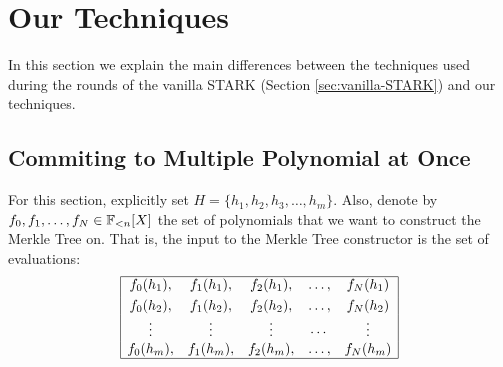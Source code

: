 

\section{Our Techniques}

In this section we explain the main differences between the techniques used during the rounds of the vanilla STARK (Section \ref{sec:vanilla-STARK}) and our techniques. 


\subsection{Commiting to Multiple Polynomial at Once}\label{sec:committing}

For this section, explicitly set $H = \{h_1,h_2,h_3,\dots,h_m\}$.
Also, denote by $f_0,f_1,\dots,f_N \in \mathbb{F}_{<n}[X]$ the set of polynomials that we want to construct the Merkle Tree on. That is, the input to the Merkle Tree constructor is the set of evaluations:
\[
\begin{array}{|ccccc|}
\hline
f_0(h_1), & f_1(h_1), & f_2(h_1), &\dots, &f_N(h_1) \\[0.1cm]
f_0(h_2), & f_1(h_2), & f_2(h_2), &\dots, &f_N(h_2) \\
\vdots & \vdots &\vdots &\cdots & \vdots \\
f_0(h_m), & f_1(h_m), & f_2(h_m), & \dots, &f_N(h_m) \\
\hline
\end{array}
\]

